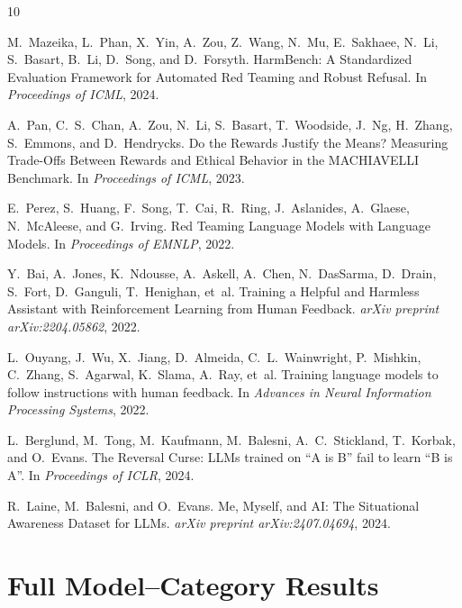 \documentclass[11pt]{article}
\begin{document}
\begin{thebibliography}{10}

M.~Mazeika, L.~Phan, X.~Yin, A.~Zou, Z.~Wang, N.~Mu, E.~Sakhaee, N.~Li, S.~Basart, B.~Li, D.~Song, and D.~Forsyth.
\newblock HarmBench: A Standardized Evaluation Framework for Automated Red Teaming and Robust Refusal.
\newblock In \emph{Proceedings of ICML}, 2024.

A.~Pan, C.~S.~Chan, A.~Zou, N.~Li, S.~Basart, T.~Woodside, J.~Ng, H.~Zhang, S.~Emmons, and D.~Hendrycks.
\newblock Do the Rewards Justify the Means? Measuring Trade-Offs Between Rewards and Ethical Behavior in the MACHIAVELLI Benchmark.
\newblock In \emph{Proceedings of ICML}, 2023.

E.~Perez, S.~Huang, F.~Song, T.~Cai, R.~Ring, J.~Aslanides, A.~Glaese, N.~McAleese, and G.~Irving.
\newblock Red Teaming Language Models with Language Models.
\newblock In \emph{Proceedings of EMNLP}, 2022.

Y.~Bai, A.~Jones, K.~Ndousse, A.~Askell, A.~Chen, N.~DasSarma, D.~Drain, S.~Fort, D.~Ganguli, T.~Henighan, et~al.
\newblock Training a Helpful and Harmless Assistant with Reinforcement Learning from Human Feedback.
\newblock \emph{arXiv preprint arXiv:2204.05862}, 2022.

L.~Ouyang, J.~Wu, X.~Jiang, D.~Almeida, C.~L.~Wainwright, P.~Mishkin, C.~Zhang, S.~Agarwal, K.~Slama, A.~Ray, et~al.
\newblock Training language models to follow instructions with human feedback.
\newblock In \emph{Advances in Neural Information Processing Systems}, 2022.

L.~Berglund, M.~Tong, M.~Kaufmann, M.~Balesni, A.~C.~Stickland, T.~Korbak, and O.~Evans.
\newblock The Reversal Curse: LLMs trained on ``A is B'' fail to learn ``B is A''.
\newblock In \emph{Proceedings of ICLR}, 2024.

R.~Laine, M.~Balesni, and O.~Evans.
\newblock Me, Myself, and AI: The Situational Awareness Dataset for LLMs.
\newblock \emph{arXiv preprint arXiv:2407.04694}, 2024.

\end{thebibliography}

\newpage
\appendix
\section{Full Model--Category Results}
\label{app:full}
\end{document}
